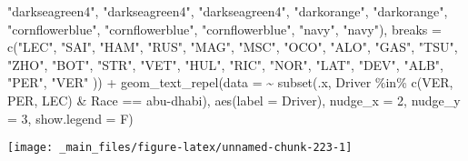 \documentclass[
]{book}
\newenvironment{Shaded}{\begin{snugshade}}{\end{snugshade}}
\newcommand{\AttributeTok}[1]{\textcolor[rgb]{0.77,0.63,0.00}{#1}}
\newcommand{\DecValTok}[1]{\textcolor[rgb]{0.00,0.00,0.81}{#1}}
\newcommand{\FunctionTok}[1]{\textcolor[rgb]{0.00,0.00,0.00}{#1}}
\newcommand{\NormalTok}[1]{#1}
\newcommand{\SpecialCharTok}[1]{\textcolor[rgb]{0.00,0.00,0.00}{#1}}
\newcommand{\StringTok}[1]{\textcolor[rgb]{0.31,0.60,0.02}{#1}}
\begin{document}
\begin{Shaded}
\begin{Highlighting}[]
                                \StringTok{"darkseagreen4"}\NormalTok{, }\StringTok{"darkseagreen4"}\NormalTok{, }\StringTok{"darkseagreen4"}\NormalTok{,}
                                \StringTok{"darkorange"}\NormalTok{, }\StringTok{"darkorange"}\NormalTok{,}
                                \StringTok{"cornflowerblue"}\NormalTok{, }\StringTok{"cornflowerblue"}\NormalTok{, }\StringTok{"cornflowerblue"}\NormalTok{,}
                                \StringTok{"navy"}\NormalTok{, }\StringTok{"navy"}\NormalTok{),}
                     \AttributeTok{breaks =} \FunctionTok{c}\NormalTok{(}\StringTok{"LEC"}\NormalTok{, }\StringTok{"SAI"}\NormalTok{,}
                                \StringTok{"HAM"}\NormalTok{, }\StringTok{"RUS"}\NormalTok{, }
                                \StringTok{"MAG"}\NormalTok{, }\StringTok{"MSC"}\NormalTok{, }
                                \StringTok{"OCO"}\NormalTok{, }\StringTok{"ALO"}\NormalTok{,}
                                \StringTok{"GAS"}\NormalTok{, }\StringTok{"TSU"}\NormalTok{,  }
                                \StringTok{"ZHO"}\NormalTok{, }\StringTok{"BOT"}\NormalTok{,}
                                \StringTok{"STR"}\NormalTok{, }\StringTok{"VET"}\NormalTok{, }\StringTok{"HUL"}\NormalTok{, }
                                \StringTok{"RIC"}\NormalTok{, }\StringTok{"NOR"}\NormalTok{,}
                                \StringTok{"LAT"}\NormalTok{, }\StringTok{"DEV"}\NormalTok{, }\StringTok{"ALB"}\NormalTok{,}
                                \StringTok{"PER"}\NormalTok{, }\StringTok{"VER"}
\NormalTok{                                )) }\SpecialCharTok{+}
  \FunctionTok{geom\_text\_repel}\NormalTok{(}\AttributeTok{data =} \SpecialCharTok{\textasciitilde{}} \FunctionTok{subset}\NormalTok{(.x, Driver }\SpecialCharTok{\%in\%} \FunctionTok{c}\NormalTok{(}\StringTok{\textquotesingle{}VER\textquotesingle{}}\NormalTok{, }\StringTok{\textquotesingle{}PER\textquotesingle{}}\NormalTok{, }\StringTok{\textquotesingle{}LEC\textquotesingle{}}\NormalTok{) }\SpecialCharTok{\&}\NormalTok{ Race }\SpecialCharTok{==} \StringTok{\textquotesingle{}abu{-}dhabi\textquotesingle{}}\NormalTok{),}
            \FunctionTok{aes}\NormalTok{(}\AttributeTok{label =}\NormalTok{ Driver),}
            \AttributeTok{nudge\_x =} \DecValTok{2}\NormalTok{, }\AttributeTok{nudge\_y =} \DecValTok{3}\NormalTok{, }\AttributeTok{show.legend =}\NormalTok{ F)}
\end{Highlighting}
\end{Shaded}

\begin{center}\texttt{[image: \_main\_files/figure-latex/unnamed-chunk-223-1]} \end{center}
\end{document}
